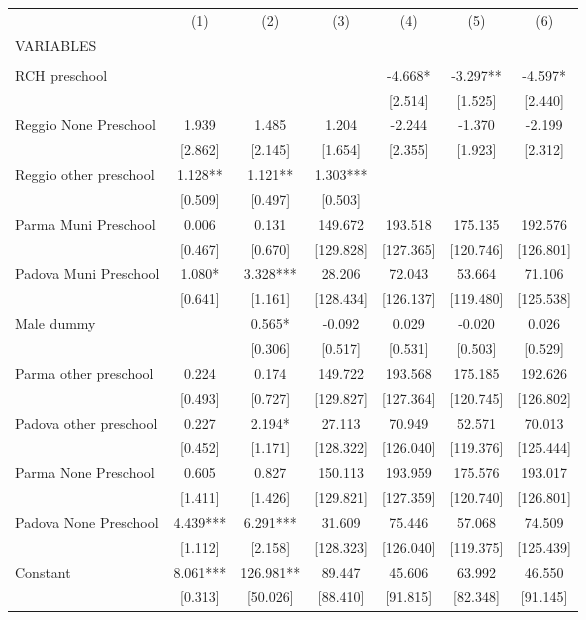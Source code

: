 \begin{tabular}{lcccccc} \hline
 & (1) & (2) & (3) & (4) & (5) & (6) \\
VARIABLES &  &  &  &  &  &  \\ \hline
 &  &  &  &  &  &  \\
RCH preschool &  &  &  & -4.668* & -3.297** & -4.597* \\
 &  &  &  & [2.514] & [1.525] & [2.440] \\
Reggio None Preschool & 1.939 & 1.485 & 1.204 & -2.244 & -1.370 & -2.199 \\
 & [2.862] & [2.145] & [1.654] & [2.355] & [1.923] & [2.312] \\
Reggio other preschool & 1.128** & 1.121** & 1.303*** &  &  &  \\
 & [0.509] & [0.497] & [0.503] &  &  &  \\
Parma Muni Preschool & 0.006 & 0.131 & 149.672 & 193.518 & 175.135 & 192.576 \\
 & [0.467] & [0.670] & [129.828] & [127.365] & [120.746] & [126.801] \\
Padova Muni Preschool & 1.080* & 3.328*** & 28.206 & 72.043 & 53.664 & 71.106 \\
 & [0.641] & [1.161] & [128.434] & [126.137] & [119.480] & [125.538] \\
Male dummy &  & 0.565* & -0.092 & 0.029 & -0.020 & 0.026 \\
 &  & [0.306] & [0.517] & [0.531] & [0.503] & [0.529] \\
Parma other preschool & 0.224 & 0.174 & 149.722 & 193.568 & 175.185 & 192.626 \\
 & [0.493] & [0.727] & [129.827] & [127.364] & [120.745] & [126.802] \\
Padova other preschool & 0.227 & 2.194* & 27.113 & 70.949 & 52.571 & 70.013 \\
 & [0.452] & [1.171] & [128.322] & [126.040] & [119.376] & [125.444] \\
Parma None Preschool & 0.605 & 0.827 & 150.113 & 193.959 & 175.576 & 193.017 \\
 & [1.411] & [1.426] & [129.821] & [127.359] & [120.740] & [126.801] \\
Padova None Preschool & 4.439*** & 6.291*** & 31.609 & 75.446 & 57.068 & 74.509 \\
 & [1.112] & [2.158] & [128.323] & [126.040] & [119.375] & [125.439] \\
Constant & 8.061*** & 126.981** & 89.447 & 45.606 & 63.992 & 46.550 \\
 & [0.313] & [50.026] & [88.410] & [91.815] & [82.348] & [91.145] \\

\end{tabular}
